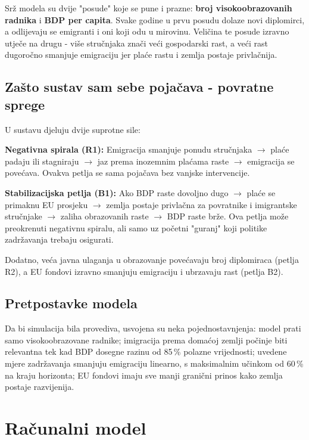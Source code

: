 \documentclass[11pt,a4paper]{article}
\begin{document}
Srž modela su dvije "posude" koje se pune i prazne: \textbf{broj visokoobrazovanih radnika} i \textbf{BDP per capita}. Svake godine u prvu posudu dolaze novi diplomirci, a odlijevaju se emigranti i oni koji odu u mirovinu. Veličina te posude izravno utječe na drugu  - više stručnjaka znači veći gospodarski rast, a veći rast dugoročno smanjuje emigraciju jer plaće rastu i zemlja postaje privlačnija.

\subsection*{Zašto sustav sam sebe pojačava  - povratne sprege}

U sustavu djeluju dvije suprotne sile:

\textbf{Negativna spirala (R1):} Emigracija smanjuje ponudu stručnjaka $\to$ plaće padaju ili stagniraju $\to$ jaz prema inozemnim plaćama raste $\to$ emigracija se povećava. Ovakva petlja se sama pojačava bez vanjske intervencije.

\textbf{Stabilizacijska petlja (B1):} Ako BDP raste dovoljno dugo $\to$ plaće se primaknu EU prosjeku $\to$ zemlja postaje privlačna za povratnike i imigrantske stručnjake $\to$ zaliha obrazovanih raste $\to$ BDP raste brže. Ova petlja može preokrenuti negativnu spiralu, ali samo uz početni "guranj" koji politike zadržavanja trebaju osigurati.

Dodatno, veća javna ulaganja u obrazovanje povećavaju broj diplomiraca (petlja R2), a EU fondovi izravno smanjuju emigraciju i ubrzavaju rast (petlja B2).

\subsection*{Pretpostavke modela}

Da bi simulacija bila provediva, usvojena su neka pojednostavnjenja: model prati samo visokoobrazovane radnike; imigracija prema domaćoj zemlji počinje biti relevantna tek kad BDP dosegne razinu od 85\,\% polazne vrijednosti; uvedene mjere zadržavanja smanjuju emigraciju linearno, s maksimalnim učinkom od 60\,\% na kraju horizonta; EU fondovi imaju sve manji granični prinos kako zemlja postaje razvijenija.

\section{Računalni model}
\end{document}
